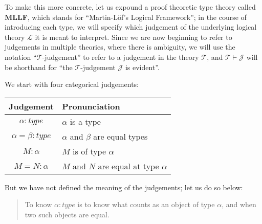 \documentclass{amsart}
\theoremstyle{definition}
\theoremstyle{remark}
\numberwithin{equation}{section}
\newcommand\reduce[2]{\ensuremath{#1\Rightarrow#2}}
\newcommand\MLLF{\textbf{MLLF}}
\newcommand\type[1]{\ensuremath{#1:\mathit{type}}}
\begin{document}

To make this more concrete, let us expound a proof theoretic type theory called
\MLLF, which stands for ``Martin-L\"of's Logical Framework''; in the course of
introducing each type, we will specify which judgement of the underlying
logical theory $\mathcal{L}$ it is meant to interpret. Since we are now
beginning to refer to judgements in multiple theories, where there is
ambiguity, we will use the notation ``$\mathcal{T}$-judgement'' to refer to a
judgement in the theory $\mathcal{T}$, and $\mathcal{T}\vdash\mathcal{J}$ will
be shorthand for ``the $\mathcal{T}$-judgement $\mathcal{J}$ is evident''.

We start with four categorical judgements:\\

\begin{tabular}{c|l}
Judgement & Pronunciation \\ \hline
  \type{\alpha} & $\alpha$ is a type \\
  \type{\alpha=\beta} & $\alpha$ and $\beta$ are equal types \\
  $M:\alpha$ & $M$ is of type $\alpha$ \\
  $M=N:\alpha$ & $M$ and $N$ are equal at type $\alpha$ \\
\end{tabular}

But we have not defined the meaning of the judgements; let us do so below:

\begin{quote}
  To know $\type\alpha$ is to know what counts as an object of type $\alpha$,
  and when two such objects are equal.
\end{quote}
\end{document}
